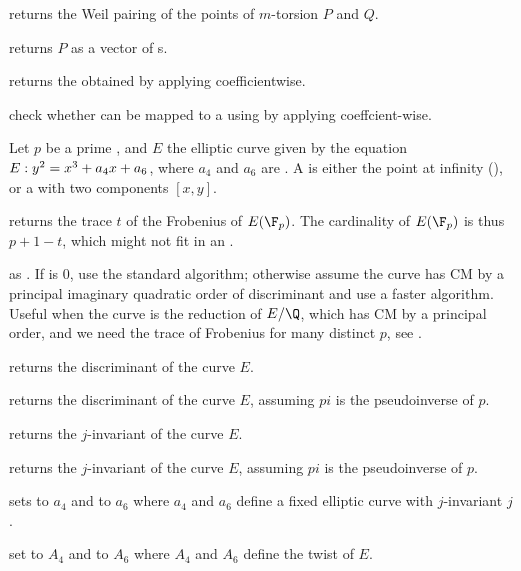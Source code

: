  returns the
Weil pairing of the points of $m$-torsion $P$ and $Q$.

 returns $P$ as a vector of s.

 returns the  obtained by applying
 coefficientwise.

 check whether  can
be mapped to a  using  by applying 
coeffcient-wise.

Let $p$ be a prime , and $E$ the elliptic curve given by the
equation $E:y^2=x^3+a_4\*x+a_6$, where $a_4$ and $a_6$ are .
A  is either the point at infinity (), or a 
with two components $[x,y]$.

 returns the trace $t$ of
the Frobenius of $E(\F_p)$. The cardinality of $E(\F_p)$ is thus $p+1-t$,
which might not fit in an .

 as
. If  is $0$, use the standard algorithm; otherwise
assume the curve has CM by a principal imaginary quadratic order of
discriminant  and use a faster algorithm. Useful when the curve is
the reduction of $E/\Q$, which has CM by a principal order, and we need the
trace of Frobenius for many distinct $p$, see .

returns the discriminant of the curve $E$.

returns the discriminant of the curve $E$, assuming $pi$ is the pseudoinverse
of $p$.

returns the $j$-invariant of the curve $E$.

returns the $j$-invariant of the curve $E$, assuming $pi$ is the pseudoinverse
of $p$.

sets  to $a_4$ and  to $a_6$ where $a_4$ and $a_6$
define a fixed elliptic curve with $j$-invariant $j$.

set  to $A_4$ and  to $A_6$ where $A_4$ and $A_6$
define the twist of $E$.

